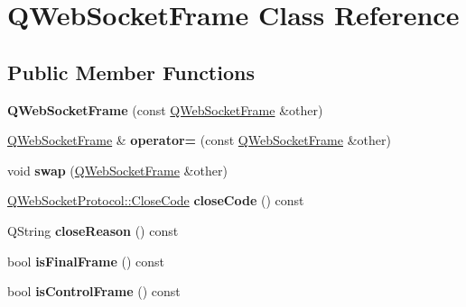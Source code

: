 \hypertarget{class_q_web_socket_frame}{}\section{Q\+Web\+Socket\+Frame Class Reference}
\label{class_q_web_socket_frame}
\subsection*{Public Member Functions}
\begin{DoxyCompactItemize}
\item 
\mbox{\label{class_q_web_socket_frame_a8d007c47e3f0fe8d532202eeb640d665}} 
{\bfseries Q\+Web\+Socket\+Frame} (const \mbox{\hyperlink{class_q_web_socket_frame}{Q\+Web\+Socket\+Frame}} \&other)
\item 
\mbox{\label{class_q_web_socket_frame_a44b7a08546c9e44bd491beb632df908f}} 
\mbox{\hyperlink{class_q_web_socket_frame}{Q\+Web\+Socket\+Frame}} \& {\bfseries operator=} (const \mbox{\hyperlink{class_q_web_socket_frame}{Q\+Web\+Socket\+Frame}} \&other)
\item 
\mbox{\label{class_q_web_socket_frame_a4e0b456cbc3523c5d92f6483ddcdd7f4}} 
void {\bfseries swap} (\mbox{\hyperlink{class_q_web_socket_frame}{Q\+Web\+Socket\+Frame}} \&other)
\item 
\mbox{\label{class_q_web_socket_frame_a745d6b16651cc6eaef38a2b4641368b2}} 
\mbox{\hyperlink{namespace_q_web_socket_protocol_a9f236676f594451d8d723f260b71028c}{Q\+Web\+Socket\+Protocol\+::\+Close\+Code}} {\bfseries close\+Code} () const
\item 
\mbox{\label{class_q_web_socket_frame_ada81728fdcc976758a6913d5b1d23239}} 
Q\+String {\bfseries close\+Reason} () const
\item 
\mbox{\label{class_q_web_socket_frame_a9ee084aee6fe85f988e667bac68fd7ff}} 
bool {\bfseries is\+Final\+Frame} () const
\item 
\mbox{\label{class_q_web_socket_frame_aa07494fd872e79537951a84df7502025}} 
bool {\bfseries is\+Control\+Frame} () const

\end{DoxyCompactItemize}
